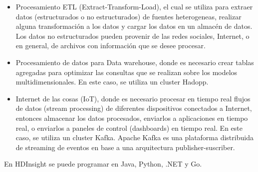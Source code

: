 \begin{itemize}
\item Procesamiento ETL (Extract-Transform-Load), el cual se utiliza para extraer datos (estructurados o no estructurados) de fuentes heterogeneas, realizar alguna transformación a los datos y cargar los datos en un almacén de datos. Los datos no estructurados pueden provenir de las redes sociales, Internet, o en general, de archivos con información que se desee procesar.
\item Procesamiento de datos para Data warehouse, donde es necesario crear tablas agregadas para optimizar las consultas que se realizan sobre los modelos multidimensionales. En este caso, se utiliza un cluster Hadopp.
\item Internet de las cosas (IoT), donde es necesario procesar en tiempo real flujos de datos (stream processing) de diferentes dispositivos conectados a Internet, entonces almacenar los datos procesados, enviarlos a aplicaciones en tiempo real, o enviarlos a paneles de control (dashboards) en tiempo real. En este caso, se utiliza un cluster Kafka. Apache Kafka es una plataforma distribuida de streaming de eventos en base a una arquitectura publisher-suscriber.
\end{itemize}

En HDInsight se puede programar en Java, Python, .NET y Go.

\clearpage
